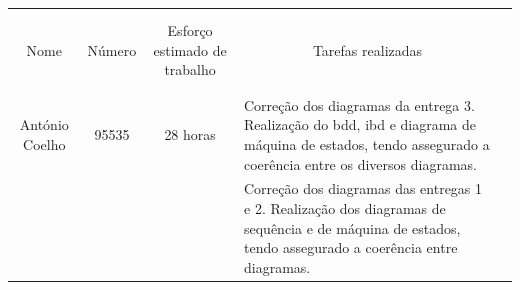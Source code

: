 \documentclass{article}
\begin{document}
    \begin{table}[H]
        \centering
        \begin{tabular}{|l|l|l|l|l}
        \cline{1-4}
        \multicolumn{1}{|l|}{}                   & \multicolumn{1}{l|}{}       & \multicolumn{1}{l|}{}                             & \multicolumn{1}{l|}{}                   &  \\
        \multicolumn{1}{|l|}{}                   & \multicolumn{1}{l|}{}       & \multicolumn{1}{l|}{}                             & \multicolumn{1}{l|}{}                   &  \\
        \multicolumn{1}{|c|}{Nome}               & \multicolumn{1}{c|}{Número} & \multicolumn{1}{c|}{Esforço estimado de trabalho} & \multicolumn{1}{c|}{Tarefas realizadas} &  \\
        \multicolumn{1}{|l|}{}                   & \multicolumn{1}{l|}{}       & \multicolumn{1}{l|}{}                             & \multicolumn{1}{l|}{}                   &  \\
        \multicolumn{1}{|l|}{}                   & \multicolumn{1}{l|}{}       & \multicolumn{1}{l|}{}                             & \multicolumn{1}{l|}{}                   &  \\ \cline{1-4}
        \multicolumn{1}{|l|}{}                   & \multicolumn{1}{l|}{}       & \multicolumn{1}{l|}{}                             & \multirow{5}{7cm}{Correção dos diagramas da entrega 3. Realização do bdd, ibd e diagrama de máquina de estados, tendo assegurado a coerência entre os diversos diagramas.}                   &  \\
        \multicolumn{1}{|l|}{}                   & \multicolumn{1}{l|}{}       & \multicolumn{1}{l|}{}                             & \multicolumn{1}{l|}{}                   &  \\
        \multicolumn{1}{|c|}{António Coelho}     & \multicolumn{1}{c|}{95535}  & \multicolumn{1}{c|}{28 horas}                     & \multicolumn{1}{l|}{}                   &  \\
        \multicolumn{1}{|l|}{}                   & \multicolumn{1}{l|}{}       & \multicolumn{1}{l|}{}                             & \multicolumn{1}{l|}{}                   &  \\
        \multicolumn{1}{|l|}{}                   & \multicolumn{1}{l|}{}       & \multicolumn{1}{l|}{}                             & \multicolumn{1}{l|}{}                   & \\ \cline{1-4}
        \multicolumn{1}{|l|}{}                   & \multicolumn{1}{l|}{}       & \multicolumn{1}{l|}{}                             & \multirow{5}{7cm}{Correção dos diagramas das entregas 1 e 2. Realização dos diagramas de sequência e de máquina de estados, tendo assegurado a coerência entre diagramas.}                   &   \\

\end{tabular}
\end{table}
\end{document}
